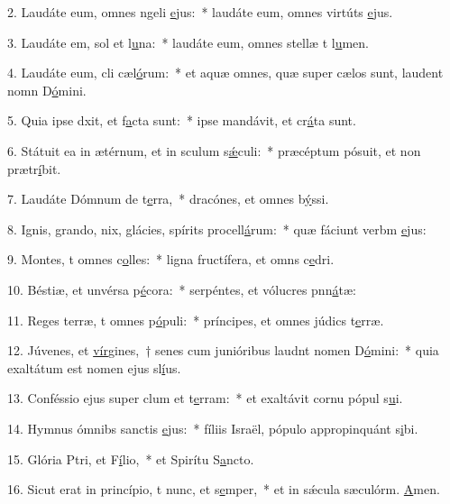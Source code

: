 2. Laudáte eum, omnes ngeli \uline{e}jus:~* laudáte eum, omnes virtúts \uline{e}jus.\par 
3. Laudáte em, sol et l\uline{u}na:~* laudáte eum, omnes stellæ t l\uline{u}men.\par 
4. Laudáte eum, cli cæl\uline{ó}rum:~* et aquæ omnes, quæ super cælos sunt, laudent nomn D\uline{ó}mini.\par 
5. Quia ipse dxit, et f\uline{a}cta sunt:~* ipse mandávit, et cr\uline{á}ta sunt.\par 
6. Státuit ea in ætérnum, et in sculum s\uline{ǽ}culi:~* præcéptum pósuit, et non prætr\uline{í}bit.\par 
7. Laudáte Dómnum de t\uline{e}rra,~* dracónes, et omnes b\uline{ý}ssi.\par 
8. Ignis, grando, nix, glácies, spírits procell\uline{á}rum:~* quæ fáciunt verbm \uline{e}jus:\par 
9. Montes, t omnes c\uline{o}lles:~* ligna fructífera, et omns c\uline{e}dri.\par 
10. Béstiæ, et unvérsa p\uline{é}cora:~* serpéntes, et vólucres pnn\uline{á}tæ:\par 
11. Reges terræ, t omnes p\uline{ó}puli:~* príncipes, et omnes júdics t\uline{e}rræ.\par 
12. Júvenes, et \uline{vír}gines,~† senes cum junióribus laudnt nomen D\uline{ó}mini:~* quia exaltátum est nomen ejus sl\uline{í}us.\par 
13. Conféssio ejus super clum et t\uline{e}rram:~* et exaltávit cornu pópul s\uline{u}i.\par 
14. Hymnus ómnibs sanctis \uline{e}jus:~* fíliis Israël, pópulo appropinquánt s\uline{i}bi.\par 
15. Glória Ptri, et F\uline{í}lio,~* et Spirítu S\uline{a}ncto.\par 
16. Sicut erat in princípio, t nunc, et s\uline{e}mper,~* et in sǽcula sæculórm. \uline{A}men.\par 
